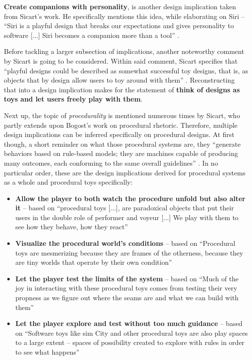 \textbf{Create companions with personality}, is another design implication taken from Sicart's work. He specifically mentions this idea, while elaborating on Siri -- \enquote{Siri is a playful design that breaks our expectations and gives personality to software [...] Siri becomes a companion more than a tool} \cite[p. 32]{sicart2014play}.

Before tackling a larger subsection of implications, another noteworthy comment by Sicart is going to be considered. Within said comment, Sicart specifies that \enquote{playful designs could be described as somewhat successful toy designs, that is, as objects that by design allow users to toy around with them} \cite[p. 40]{sicart2014play}. Reconstructing that into a design implication makes for the statement of \textbf{think of designs as toys and let users freely play with them}.

Next up, the topic of \textit{procedurality} is mentioned numerous times by Sicart, who partly extends upon Bogost's work on procedural rhetoric. Therefore, multiple design implications can be inferred specifically on procedural designs. At first though, a short reminder on what those procedural systems are, they \enquote{generate behaviors based on rule-based models; they are machines capable of producing many outcomes, each conforming to the same overall guidelines} \cite[p. 4]{bogost2007persuasive}. In no particular order, these are the design implications derived for procedural systems as a whole and procedural toys specifically:

\begin{itemize}
  \item{\textbf{Allow the player to both watch the procedure unfold but also alter it} -- based on \enquote{procedural toys [...], are paradoxical objects that put their users in the double role of performer and voyeur [...] We play with them to see how they behave, how they react} \cite[p. 41]{sicart2014play}}
  \item{\textbf{Visualize the procedural world's conditions} -- based on \enquote{Procedural toys are mesmerizing because they are frames of the otherness, because they are tiny worlds that operate by their own condition} \cite[p. 43]{sicart2014play}}
  \item{\textbf{Let the player test the limits of the system} -- based on \enquote{Much of the joy in interacting with these procedural toys comes from testing their very propness as we figure out where the seams are and what we can build with them} \cite[p. 57]{sicart2014play}}
  \item{\textbf{Let the player explore and test without too much guidance} -- based on \enquote{Software toys like sim City and other procedural toys are also play spaces to a large extent -- spaces of possibility created to explore with rules in order to see what happens} \cite[p. 51]{sicart2014play}}
\end{itemize}

